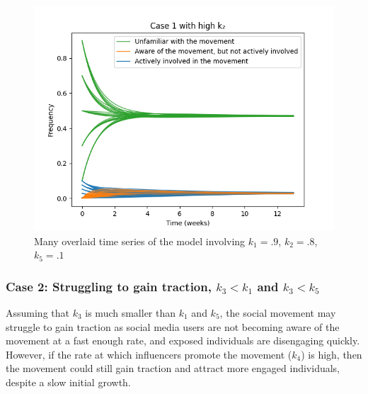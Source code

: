 \documentclass{article}
\begin{document}
    \begin{figure}[H]

        \centering
        \includegraphics[width=\textwidth]{simulation/plots/case1-highk2.png}   
        \caption{Many overlaid time series of the model involving \mbox{$k_1=.9$}, \mbox{$k_2=.8$}, \mbox{$k_5=.1$}}
        \label{fig:case1_highk2}
    \end{figure}


    \subsubsection*{Case 2: Struggling to gain traction, $k_3 < k_1$ and $k_3 < k_5$}
    Assuming that $k_3$ is much smaller than $k_1$ and $k_5$, the social movement may struggle to gain traction as social media users are not becoming aware of the movement at a fast enough rate, and exposed individuals are disengaging quickly. However, if the rate at which influencers promote the movement ($k_4$) is high, then the movement could still gain traction and attract more engaged individuals, despite a slow initial growth.
\end{document}
